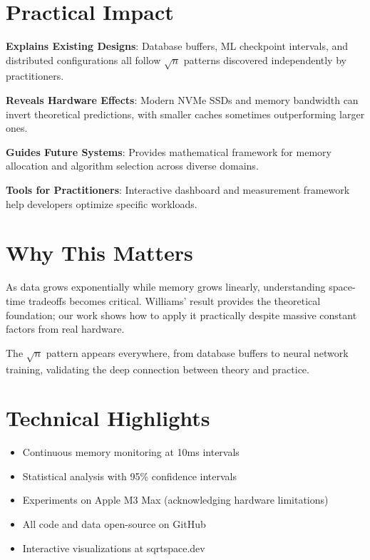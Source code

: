 \documentclass[11pt,twocolumn]{article}
\begin{document}
\section{Practical Impact}

\textbf{Explains Existing Designs}: Database buffers, ML checkpoint intervals, and distributed configurations all follow $\sqrt{n}$ patterns discovered independently by practitioners.

\textbf{Reveals Hardware Effects}: Modern NVMe SSDs and memory bandwidth can invert theoretical predictions, with smaller caches sometimes outperforming larger ones.

\textbf{Guides Future Systems}: Provides mathematical framework for memory allocation and algorithm selection across diverse domains.

\textbf{Tools for Practitioners}: Interactive dashboard and measurement framework help developers optimize specific workloads.

\section{Why This Matters}

As data grows exponentially while memory grows linearly, understanding space-time tradeoffs becomes critical. Williams' result provides the theoretical foundation; our work shows how to apply it practically despite massive constant factors from real hardware.

The $\sqrt{n}$ pattern appears everywhere, from database buffers to neural network training, validating the deep connection between theory and practice.

\section{Technical Highlights}
\begin{itemize}
\item Continuous memory monitoring at 10ms intervals
\item Statistical analysis with 95\% confidence intervals
\item Experiments on Apple M3 Max (acknowledging hardware limitations)
\item All code and data open-source on GitHub
\item Interactive visualizations at sqrtspace.dev
\end{itemize}
\end{document}
